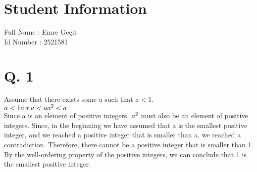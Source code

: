 \documentclass[10pt]{article}
\begin{document}
\section*{Student Information } 
Full Name :  Emre Geçit \\
Id Number :  2521581 \\

\section*{Q. 1}
Assume that there exists some a such that $a < 1$.\\
$a < 1\\
a * a < a\\
a\textsuperscript{2} < a$\\Since a is an element of positive integers, $a\textsuperscript{2}$ must also be an element of positive integers. Since, in the beginning we have assumed that a is the smallest positive integer, and we reached a positive integer that is smaller than a, we reached a contradiction. Therefore, there cannot be a positive integer that is smaller than 1. By the well-ordering property of the positive integers, we can conclude that 1 is the smallest positive integer.
\end{document}

